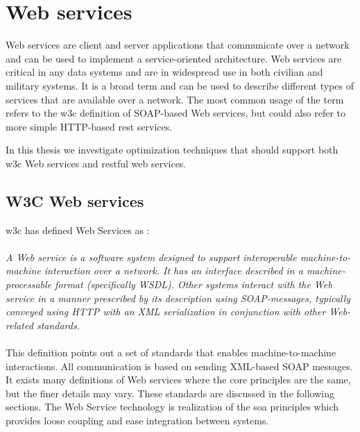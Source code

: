 \section{Web services}
\label{web-services}
Web services are client and server applications that communicate over a
network and can be used to implement a service-oriented architecture. Web
services are critical in any data systems and are in widespread use in both
civilian and military systems. It is a broad term and can be used to describe
different types of services that are available over a network. The most common
usage of the term refers to the \gls{w3c} definition of SOAP-based Web
services, but could also refer to more simple HTTP-based \gls{rest} services.

In this thesis we investigate optimization techniques that should support both
\gls{w3c} Web services and \gls{rest}ful web services.

\subsection{W3C Web services}

\gls{w3c} has defined Web Services as \cite{wrc-web-service}:

\paragraph{}
\textit{
    A Web service is a software system designed to support interoperable
    machine-to-machine interaction over a network. It has an interface described in
    a machine-processable format (specifically WSDL). Other systems interact with
    the Web service in a manner prescribed by its description using SOAP-messages,
    typically conveyed using HTTP with an XML serialization in conjunction with
    other Web-related standards.
}

\paragraph{}

This definition points out a set of standards that enables machine-to-machine
interactions. All communication is based on sending XML-based SOAP messages.
It exists many definitions of Web services where the core principles are the
same, but the finer details may vary.  These standards are discussed in the
following sections. The Web Service technology is realization of the \gls{soa}
principles which provides loose coupling and ease integration between systems.

